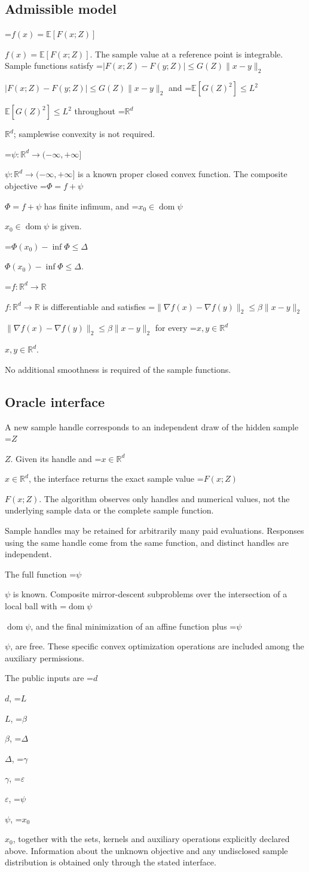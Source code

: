 \documentclass[10pt,a4paper]{article}
\newcommand{\AtlasMath}[1]{\par\begingroup\centering\setbox0=\hbox{$\displaystyle #1$}\ifdim\wd0>1.4\linewidth\typeout{ATLAS WIDE FORMULA: \the\wd0}\fi\ifdim\wd0>\linewidth\resizebox{\linewidth}{!}{\box0}\else\box0\fi\par\endgroup}
\newcommand{\AtlasInlineMath}[1]{\begingroup\setbox0=\hbox{$#1$}\ifdim\wd0>.4\linewidth\endgroup\AtlasMath{#1}\else\endgroup$#1$\fi}
\begin{document}
\subsection{Admissible model}
\AtlasInlineMath{f(x)=\mathbb{E}[F(x;Z)]}. The sample value at a reference point is integrable. Sample functions satisfy \AtlasInlineMath{|F(x;Z)-F(y;Z)|\le G(Z)\|x-y\|_2} and \AtlasInlineMath{\mathbb{E}[G(Z)^2]\le L^2} throughout \AtlasInlineMath{\mathbb{R}^d}; samplewise convexity is not required.

\AtlasInlineMath{\psi:\mathbb{R}^d\to(-\infty,+\infty]} is a known proper closed convex function. The composite objective \AtlasInlineMath{\Phi=f+\psi} has finite infimum, and \AtlasInlineMath{x_0\in\operatorname{dom}\psi} is given.

\AtlasInlineMath{\Phi(x_0)-\inf\Phi\le\Delta}.

\AtlasInlineMath{f:\mathbb{R}^d\to\mathbb{R}} is differentiable and satisfies \AtlasInlineMath{\|\nabla f(x)-\nabla f(y)\|_2\le\beta\|x-y\|_2} for every \AtlasInlineMath{x,y\in\mathbb{R}^d}.

No additional smoothness is required of the sample functions.

\subsection{Oracle interface}
A new sample handle corresponds to an independent draw of the hidden sample \AtlasInlineMath{Z}. Given its handle and \AtlasInlineMath{x\in \mathbb{R}^d}, the interface returns the exact sample value \AtlasInlineMath{F(x;Z)}. The algorithm observes only handles and numerical values, not the underlying sample data or the complete sample function.

Sample handles may be retained for arbitrarily many paid evaluations. Responses using the same handle come from the same function, and distinct handles are independent.

The full function \AtlasInlineMath{\psi} is known. Composite mirror-descent subproblems over the intersection of a local ball with \AtlasInlineMath{\operatorname{dom}\psi}, and the final minimization of an affine function plus \AtlasInlineMath{\psi}, are free. These specific convex optimization operations are included among the auxiliary permissions.

The public inputs are \AtlasInlineMath{d}, \AtlasInlineMath{L}, \AtlasInlineMath{\beta}, \AtlasInlineMath{\Delta}, \AtlasInlineMath{\gamma}, \AtlasInlineMath{\varepsilon}, \AtlasInlineMath{\psi}, \AtlasInlineMath{x_0}, together with the sets, kernels and auxiliary operations explicitly declared above. Information about the unknown objective and any undisclosed sample distribution is obtained only through the stated interface.
\end{document}
